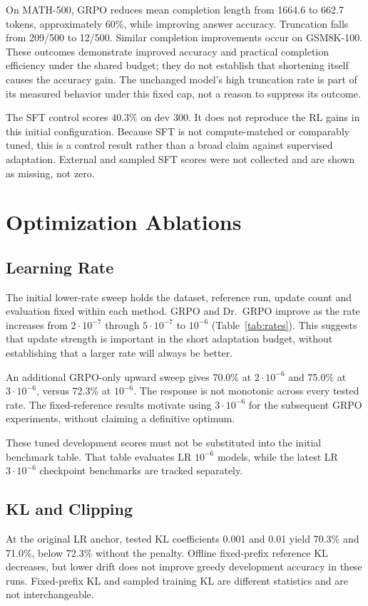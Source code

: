 \documentclass[conference]{IEEEtran}
\begin{document}
On MATH-500, GRPO reduces mean completion length from 1664.6 to 662.7 tokens, approximately 60\%, while improving answer accuracy. Truncation falls from 209/500 to 12/500. Similar completion improvements occur on GSM8K-100. These outcomes demonstrate improved accuracy and practical completion efficiency under the shared budget; they do not establish that shortening itself causes the accuracy gain. The unchanged model's high truncation rate is part of its measured behavior under this fixed cap, not a reason to suppress its outcome.

The SFT control scores 40.3\% on dev 300. It does not reproduce the RL gains in this initial configuration. Because SFT is not compute-matched or comparably tuned, this is a control result rather than a broad claim against supervised adaptation. External and sampled SFT scores were not collected and are shown as missing, not zero.

\section{Optimization Ablations}


\subsection{Learning Rate}
The initial lower-rate sweep holds the dataset, reference run, update count and evaluation fixed within each method. GRPO and Dr.~GRPO improve as the rate increases from $2\cdot 10^{-7}$ through $5\cdot 10^{-7}$ to $10^{-6}$ (Table~\ref{tab:rates}). This suggests that update strength is important in the short adaptation budget, without establishing that a larger rate will always be better.

An additional GRPO-only upward sweep gives 70.0\% at $2\cdot 10^{-6}$ and 75.0\% at $3\cdot 10^{-6}$, versus 72.3\% at $10^{-6}$. The response is not monotonic across every tested rate. The fixed-reference results motivate using $3\cdot10^{-6}$ for the subsequent GRPO experiments, without claiming a definitive optimum.

These tuned development scores must not be substituted into the initial benchmark table. That table evaluates LR $10^{-6}$ models, while the latest LR $3\cdot 10^{-6}$ checkpoint benchmarks are tracked separately.

\subsection{KL and Clipping}
At the original LR anchor, tested KL coefficients 0.001 and 0.01 yield 70.3\% and 71.0\%, below 72.3\% without the penalty. Offline fixed-prefix reference KL decreases, but lower drift does not improve greedy development accuracy in these runs. Fixed-prefix KL and sampled training KL are different statistics and are not interchangeable.
\end{document}
